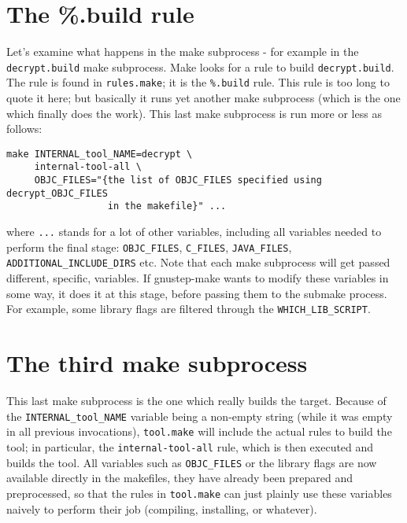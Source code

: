 \documentclass[a4paper]{article}
\begin{document}
\section{The \%.build rule}
Let's examine what happens in the make subprocess - for example in the
\texttt{decrypt.build} make subprocess.  Make looks for a rule to
build \texttt{decrypt.build}.  The rule is found in
\texttt{rules.make}; it is the \texttt{\%.build} rule.  This rule is
too long to quote it here; but basically it runs yet another make
subprocess (which is the one which finally does the work).  This last
make subprocess is run more or less as follows:
\begin{verbatim}
make INTERNAL_tool_NAME=decrypt \
     internal-tool-all \
     OBJC_FILES="{the list of OBJC_FILES specified using decrypt_OBJC_FILES
                  in the makefile}" ...
\end{verbatim}
where \texttt{...} stands for a lot of other variables, including all
variables needed to perform the final stage: \texttt{OBJC\_FILES},
\texttt{C\_FILES}, \texttt{JAVA\_FILES},
\texttt{ADDITIONAL\_INCLUDE\_DIRS} etc.  Note that each make
subprocess will get passed different, specific, variables.  If
gnustep-make wants to modify these variables in some way, it does it
at this stage, before passing them to the submake process.  For
example, some library flags are filtered through the
\texttt{WHICH\_LIB\_SCRIPT}.

\section{The third make subprocess}
This last make subprocess is the one which really builds the target.
Because of the \texttt{INTERNAL\_tool\_NAME} variable being a
non-empty string (while it was empty in all previous invocations),
\texttt{tool.make} will include the actual rules to build the tool; in
particular, the \texttt{internal-tool-all} rule, which is then
executed and builds the tool.  All variables such as
\texttt{OBJC\_FILES} or the library flags are now available directly in
the makefiles, they have already been prepared and preprocessed, so
that the rules in \texttt{tool.make} can just plainly use these
variables naively to perform their job (compiling, installing, or
whatever).
\end{document}
